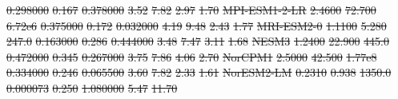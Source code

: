\documentclass[gmd, manuscript]{copernicus}
\providecommand{\DIFdel}[1]{{\protect\color{red}\sout{#1}}}                      %
\providecommand{\DIFdelFL}[1]{\DIFdel{#1}} %
\begin{document}
\begin{table}[t]
{\DIFdelFL{0.298000 }%
\DIFdelFL{0.167 }%
\DIFdelFL{0.378000 }%
\DIFdelFL{3.52 }%
\DIFdelFL{7.82 }%
\DIFdelFL{2.97 }%
\DIFdelFL{1.70 }%
\DIFdelFL{MPI-ESM1-2-LR   }%
\DIFdelFL{2.4600 }%
\DIFdelFL{72.700 }%
\DIFdelFL{6.72e6 }%
\DIFdelFL{0.375000 }%
\DIFdelFL{0.172 }%
\DIFdelFL{0.032000 }%
\DIFdelFL{4.19 }%
\DIFdelFL{9.48 }%
\DIFdelFL{2.43 }%
\DIFdelFL{1.77 }%
\DIFdelFL{MRI-ESM2-0      }%
\DIFdelFL{1.1100 }%
\DIFdelFL{5.280 }%
\DIFdelFL{247.0 }%
\DIFdelFL{0.163000 }%
\DIFdelFL{0.286 }%
\DIFdelFL{0.444000 }%
\DIFdelFL{3.48 }%
\DIFdelFL{7.47 }%
\DIFdelFL{3.11 }%
\DIFdelFL{1.68 }%
\DIFdelFL{NESM3           }%
\DIFdelFL{1.2400 }%
\DIFdelFL{22.900 }%
\DIFdelFL{445.0 }%
\DIFdelFL{0.472000 }%
\DIFdelFL{0.345 }%
\DIFdelFL{0.267000 }%
\DIFdelFL{3.75 }%
\DIFdelFL{7.86 }%
\DIFdelFL{4.06 }%
\DIFdelFL{2.70 }%
\DIFdelFL{NorCPM1         }%
\DIFdelFL{2.5000 }%
\DIFdelFL{42.500 }%
\DIFdelFL{1.77e8 }%
\DIFdelFL{0.334000 }%
\DIFdelFL{0.246 }%
\DIFdelFL{0.065500 }%
\DIFdelFL{3.60 }%
\DIFdelFL{7.82 }%
\DIFdelFL{2.33 }%
\DIFdelFL{1.61 }%
\DIFdelFL{NorESM2-LM      }%
\DIFdelFL{0.2310 }%
\DIFdelFL{0.938 }%
\DIFdelFL{1350.0 }%
\DIFdelFL{0.000073 }%
\DIFdelFL{0.250 }%
\DIFdelFL{1.080000 }%
\DIFdelFL{5.47 }%
\DIFdelFL{11.70 }%
}
\end{table}
\end{document}
